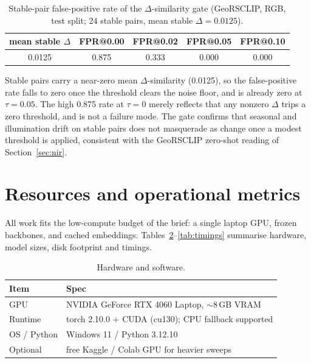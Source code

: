 \documentclass{article}
\begin{document}
\begin{table}[H]
    \centering
    \caption{Stable-pair false-positive rate of the $\Delta$-similarity gate
    (GeoRSCLIP, RGB, test split; 24 stable pairs, mean stable $\Delta = 0.0125$).}
    \label{tab:seasonalgate}
    \begin{tabular}{ccccc}
        \toprule
        \textbf{mean stable $\Delta$} & \textbf{FPR@0.00} & \textbf{FPR@0.02} & \textbf{FPR@0.05} & \textbf{FPR@0.10} \\
        \midrule
        0.0125 & 0.875 & 0.333 & 0.000 & 0.000 \\
        \bottomrule
    \end{tabular}
\end{table}

Stable pairs carry a near-zero mean $\Delta$-similarity (0.0125), so the
false-positive rate falls to zero once the threshold clears the noise floor, and
is already zero at $\tau = 0.05$. The high 0.875 rate at $\tau = 0$ merely
reflects that any nonzero $\Delta$ trips a zero threshold, and is not a failure
mode. The gate confirms that seasonal and illumination drift on stable pairs does
not masquerade as change once a modest threshold is applied, consistent with the
GeoRSCLIP zero-shot reading of Section~\ref{sec:nir}.


\section{Resources and operational metrics}
\label{sec:resources}

All work fits the low-compute budget of the brief: a single laptop GPU, frozen
backbones, and cached embeddings. Tables~\ref{tab:hw}--\ref{tab:timings}
summarise hardware, model sizes, disk footprint and timings.

\begin{table}[H]
    \centering
    \caption{Hardware and software.}
    \label{tab:hw}
    \begin{tabular}{ll}
        \toprule
        \textbf{Item} & \textbf{Spec} \\
        \midrule
        GPU        & NVIDIA GeForce RTX 4060 Laptop, $\sim$8\,GB VRAM \\
        Runtime    & torch 2.10.0 + CUDA (cu130); CPU fallback supported \\
        OS / Python & Windows 11 / Python 3.12.10 \\
        Optional   & free Kaggle / Colab GPU for heavier sweeps \\
        \bottomrule
    \end{tabular}
\end{table}
\end{document}
